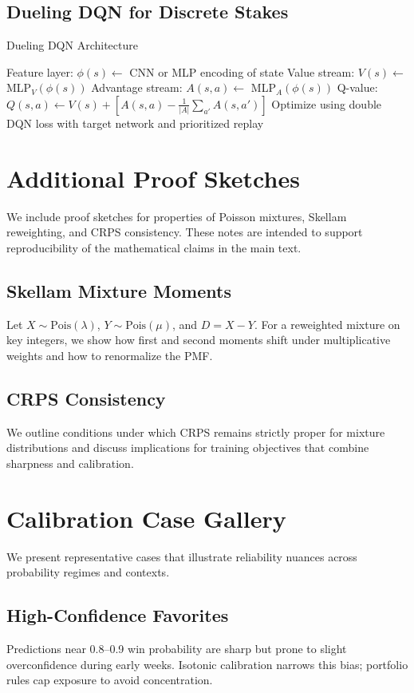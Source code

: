 \documentclass[12pt]{report}  %
\numberwithin{equation}{section}
\theoremstyle{plain}
\theoremstyle{definition}
\theoremstyle{remark}
\begin{document}
\section{Dueling DQN for Discrete Stakes}
\begin{algorithm}[H]
\caption{Dueling DQN Architecture}
\begin{algorithmic}[1]
\State Feature layer: $\phi(s) \gets$ CNN or MLP encoding of state
\State Value stream: $V(s) \gets$ MLP$_V(\phi(s))$
\State Advantage stream: $A(s,a) \gets$ MLP$_A(\phi(s))$
\State Q-value: $Q(s,a) \gets V(s) + \left[A(s,a) - \frac{1}{|A|}\sum_{a'} A(s,a')\right]$
\State Optimize using double DQN loss with target network and prioritized replay
\end{algorithmic}
\end{algorithm}

\chapter{Additional Proof Sketches}
We include proof sketches for properties of Poisson mixtures, Skellam reweighting, and CRPS consistency. These notes are intended to support reproducibility of the mathematical claims in the main text.

\section{Skellam Mixture Moments}
Let $X\sim\text{Pois}(\lambda)$, $Y\sim\text{Pois}(\mu)$, and $D=X-Y$. For a reweighted mixture on key integers, we show how first and second moments shift under multiplicative weights and how to renormalize the PMF.

\section{CRPS Consistency}
We outline conditions under which CRPS remains strictly proper for mixture distributions and discuss implications for training objectives that combine sharpness and calibration.

\chapter{Calibration Case Gallery}
We present representative cases that illustrate reliability nuances across probability regimes and contexts.

\section{High-Confidence Favorites}
Predictions near 0.8–0.9 win probability are sharp but prone to slight overconfidence during early weeks. Isotonic calibration narrows this bias; portfolio rules cap exposure to avoid concentration.
\end{document}
